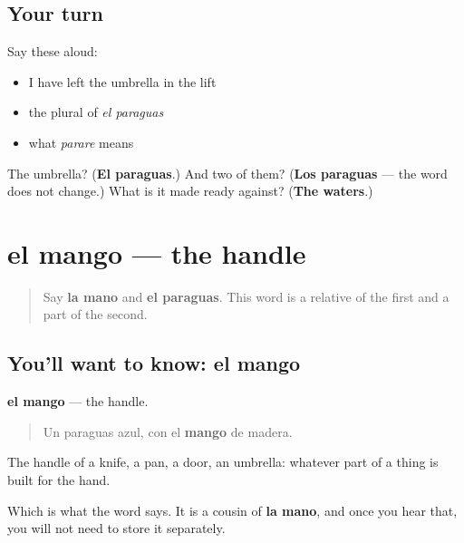 \subsection*{Your turn}
Say these aloud:

\begin{itemize}
\raggedright
  \item I have left the umbrella in the lift
  \item the plural of \emph{el paraguas}
  \item what \emph{parare} means
\end{itemize}

\begin{tcolorbox}[breakable,colback=teal!4,colframe=teal!35!black,title={Before you move on}]
The umbrella? (\textbf{El paraguas}.) And two of them? (\textbf{Los paraguas} — the word does not change.) What is it made ready against? (\textbf{The waters}.)
\end{tcolorbox}
\section[el mango]{el mango — the handle}

\label{lesson:ES-C470-mango}



\begin{quote}
Say \textbf{la mano} and \textbf{el paraguas}. This word is a relative of the first and a part of the second.
\end{quote}

\subsection*{You'll want to know: el mango}
\textbf{el mango} — the handle.

\begin{quote}
Un paraguas azul, con el \textbf{mango} de madera.
\end{quote}

The handle of a knife, a pan, a door, an umbrella: whatever part of a thing is built for the hand.

Which is what the word says. It is a cousin of \textbf{la mano}, and once you hear that, you will not need to store it separately.

